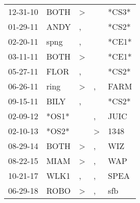 \begin{supertabular}{lllll}
 12-31-10 &   BOTH &  \textgreater &               &  *CS3* \\
 01-29-11 &   ANDY &             , &               &  *CS2* \\
 02-20-11 &   spng &             , &               &  *CE1* \\
 03-11-11 &   BOTH &  \textgreater &               &  *CE1* \\
 05-27-11 &   FLOR &             , &               &  *CS2* \\
 06-26-11 &   ring &  \textgreater &             , &   FARM \\
 09-15-11 &   BILY &             , &               &  *CS2* \\
 02-09-12 &  *OS1* &               &             , &   JUIC \\
 02-10-13 &  *OS2* &               &  \textgreater &   1348 \\
 08-29-14 &   BOTH &  \textgreater &             , &    WIZ \\
 08-22-15 &   MIAM &  \textgreater &             , &    WAP \\
 10-21-17 &   WLK1 &             , &             , &   SPEA \\
 06-29-18 &   ROBO &  \textgreater &             , &    sfb \\
\end{supertabular}
